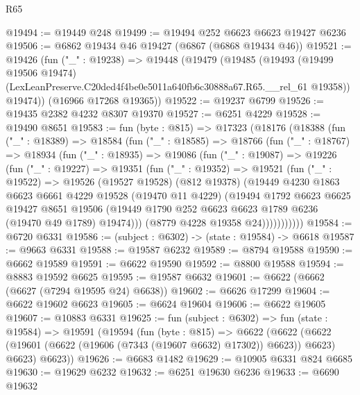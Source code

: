 \begin{lexlean}{R65}
\begin{coremodule}
{@19494 := @19449 @248
@19499 := @19494 @252 @6623 @6623 @19427 @6236
@19506 := @6862 @19434 @46 @19427 (@6867 (@6868 @19434 @46))
@19521 := @19426
    (fun ("_" : @19238) =>
    @19448
      (@19479
        (@19485
          (@19493
            (@19499 @19506 @19474)
            (LexLeanPreserve.C20ded4f4be0e5011a640fb6c30888a67.R65.__rel_61 @19358))
          @19474))
      (@16966 @17268 @19365))
@19522 := @19237 @6799
@19526 := @19435 @2382 @4232 @8307 @19370
@19527 := @6251 @4229
@19528 := @19490 @8651
@19583 := fun (byte : @815) =>
  @17323
    (@18176
      (@18388
        (fun ("_" : @18389) =>
        @18584
          (fun ("_" : @18585) =>
          @18766
            (fun ("_" : @18767) =>
            @18934
              (fun ("_" : @18935) =>
              @19086
                (fun ("_" : @19087) =>
                @19226
                  (fun ("_" : @19227) =>
                  @19351
                    (fun ("_" : @19352) =>
                    @19521
                      (fun ("_" : @19522) =>
                      @19526
                        (@19527 @19528)
                        (@812 @19378)
                        (@19449
                          @4230
                          @1863
                          @6623
                          @6661
                          @4229
                          @19528
                          (@19470 @11 @4229)
                          (@19494
                            @1792
                            @6623
                            @6625
                            @19427
                            @8651
                            @19506
                            (@19449 @1790 @252 @6623 @6623 @1789 @6236 (@19470 @49 @1789) @19474)))
                        (@8779 @4228 @19358 @24)))))))))))
@19584 := @6720 @6331
@19586 := (subject : @6302) -> (state : @19584) -> @6618
@19587 := @9663 @6331
@19588 := @19587 @6232
@19589 := @8794 @19588
@19590 := @6662 @19589
@19591 := @6622 @19590
@19592 := @8800 @19588
@19594 := @8883 @19592 @6625
@19595 := @19587 @6632
@19601 := @6622 (@6662 (@6627 (@7294 @19595 @24) @6638))
@19602 := @6626 @17299
@19604 := @6622 @19602 @6623
@19605 := @6624 @19604
@19606 := @6622 @19605
@19607 := @10883 @6331
@19625 := fun (subject : @6302) =>
  fun (state : @19584) =>
  @19591
    (@19594
      (fun (byte : @815) =>
      @6622
        (@6622 (@6622 (@19601 (@6622 (@19606 (@7343 (@19607 @6632) @17302)) @6623)) @6623) @6623)
        @6623))
@19626 := @6683 @1482
@19629 := @10905 @6331 @824 @6685
@19630 := @19629 @6232
@19632 := @6251 @19630 @6236
@19633 := @6690 @19632
}
\end{coremodule}
\end{lexlean}
